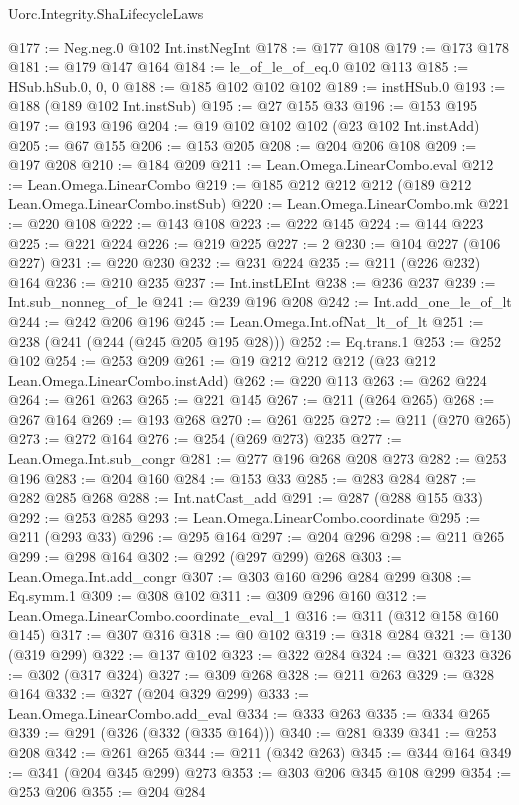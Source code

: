 \begin{lexlean}{Uorc.Integrity.ShaLifecycleLaws}
\begin{coremodule}
@177 := Neg.neg.{0} @102 Int.instNegInt
@178 := @177 @108
@179 := @173 @178
@181 := @179 @147 @164
@184 := le_of_le_of_eq.{0} @102 @113
@185 := HSub.hSub.{0, 0, 0}
@188 := @185 @102 @102 @102
@189 := instHSub.{0}
@193 := @188 (@189 @102 Int.instSub)
@195 := @27 @155 @33
@196 := @153 @195
@197 := @193 @196
@204 := @19 @102 @102 @102 (@23 @102 Int.instAdd)
@205 := @67 @155
@206 := @153 @205
@208 := @204 @206 @108
@209 := @197 @208
@210 := @184 @209
@211 := Lean.Omega.LinearCombo.eval
@212 := Lean.Omega.LinearCombo
@219 := @185 @212 @212 @212 (@189 @212 Lean.Omega.LinearCombo.instSub)
@220 := Lean.Omega.LinearCombo.mk
@221 := @220 @108
@222 := @143 @108
@223 := @222 @145
@224 := @144 @223
@225 := @221 @224
@226 := @219 @225
@227 := 2
@230 := @104 @227 (@106 @227)
@231 := @220 @230
@232 := @231 @224
@235 := @211 (@226 @232) @164
@236 := @210 @235
@237 := Int.instLEInt
@238 := @236 @237
@239 := Int.sub_nonneg_of_le
@241 := @239 @196 @208
@242 := Int.add_one_le_of_lt
@244 := @242 @206 @196
@245 := Lean.Omega.Int.ofNat_lt_of_lt
@251 := @238 (@241 (@244 (@245 @205 @195 @28)))
@252 := Eq.trans.{1}
@253 := @252 @102
@254 := @253 @209
@261 := @19 @212 @212 @212 (@23 @212 Lean.Omega.LinearCombo.instAdd)
@262 := @220 @113
@263 := @262 @224
@264 := @261 @263
@265 := @221 @145
@267 := @211 (@264 @265)
@268 := @267 @164
@269 := @193 @268
@270 := @261 @225
@272 := @211 (@270 @265)
@273 := @272 @164
@276 := @254 (@269 @273) @235
@277 := Lean.Omega.Int.sub_congr
@281 := @277 @196 @268 @208 @273
@282 := @253 @196
@283 := @204 @160
@284 := @153 @33
@285 := @283 @284
@287 := @282 @285 @268
@288 := Int.natCast_add
@291 := @287 (@288 @155 @33)
@292 := @253 @285
@293 := Lean.Omega.LinearCombo.coordinate
@295 := @211 (@293 @33)
@296 := @295 @164
@297 := @204 @296
@298 := @211 @265
@299 := @298 @164
@302 := @292 (@297 @299) @268
@303 := Lean.Omega.Int.add_congr
@307 := @303 @160 @296 @284 @299
@308 := Eq.symm.{1}
@309 := @308 @102
@311 := @309 @296 @160
@312 := Lean.Omega.LinearCombo.coordinate_eval_1
@316 := @311 (@312 @158 @160 @145)
@317 := @307 @316
@318 := @0 @102
@319 := @318 @284
@321 := @130 (@319 @299)
@322 := @137 @102
@323 := @322 @284
@324 := @321 @323
@326 := @302 (@317 @324)
@327 := @309 @268
@328 := @211 @263
@329 := @328 @164
@332 := @327 (@204 @329 @299)
@333 := Lean.Omega.LinearCombo.add_eval
@334 := @333 @263
@335 := @334 @265
@339 := @291 (@326 (@332 (@335 @164)))
@340 := @281 @339
@341 := @253 @208
@342 := @261 @265
@344 := @211 (@342 @263)
@345 := @344 @164
@349 := @341 (@204 @345 @299) @273
@353 := @303 @206 @345 @108 @299
@354 := @253 @206
@355 := @204 @284

\end{coremodule}
\end{lexlean}
